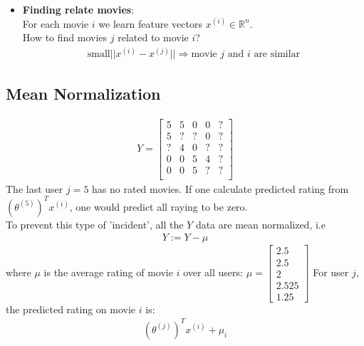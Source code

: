 \documentclass[a4paper,12pt]{report}
\begin{document}
\begin{itemize}
\item \textbf{Finding relate movies}:\\ 
For each movie  $i$ we learn feature vectors $x^{(i)} \in \mathbb{R}^n$. \\
How to find movies $j$ related to movie $i$?
\begin{align}
\text{small} || x^{(i)} - x^{(j)}|| \Rightarrow \text{movie \ $j$ \ and \ $i$ \ are \ similar} 
\end{align}
\end{itemize}
\subsection{Mean Normalization}
\begin{align}
Y = \left[ \begin{array}{ccccc} 
	5 & 5 & 0 & 0 &?\\
	5 & ? & ? & 0 &? \\
	? & 4 & 0 & ? &? \\
	0 & 0 & 5 & 4 &? \\
	0 & 0 & 5 & ? &? \\
\end{array}\right]
\end{align}
The last user $j=5$ has no rated movies. If one calculate predicted rating from $(\theta^{(5)})^T x^{(i)}$, one would predict all raying to be zero.\\
To prevent this type of 'incident', all the $Y$ data are mean normalized, i.e
\begin{align}
Y := Y  - \mu
\end{align}
where $\mu$ is the average rating of movie $i$ over all users: $\mu = \left[ \begin{smallmatrix} 2.5 \\ 2.5 \\ 2 \\ 2.525 \\ 1.25 \end{smallmatrix} \right]$
For user $j$, the predicted rating on movie $i$ is:
\begin{align}
(\theta^{(j)})^T x^{(i)} + \mu_i
\end{align}
\end{document}
